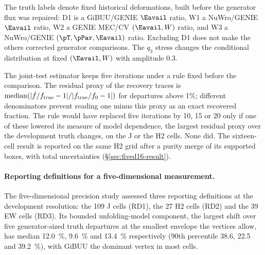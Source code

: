 The truth labels denote fixed historical deformations, built before the generator flux was repaired: D1 is a GiBUU/GENIE $\Eavail$ ratio, W1 a NuWro/GENIE $\Eavail$ ratio, W2 a GENIE MEC/CV $(\Eavail,W)$ ratio, and W3 a NuWro/GENIE $(\pT,\pPar,\Eavail)$ ratio. Excluding D1 does not make the others corrected generator comparisons. The $q_3$ stress changes the conditional distribution at fixed $(\Eavail,W)$ with amplitude 0.3.

The joint-test estimator keeps five iterations under a rule fixed before the comparison. The residual proxy of the recovery traces is $\operatorname{median}(|\hat f/f_{\rm true}-1|/|f_{\rm true}/f_0-1|)$ for departures above 1\%; different denominators prevent reading one minus this proxy as an exact recovered fraction. The rule would have replaced five iterations by 10, 15 or 20 only if one of these lowered its measure of model dependence, the largest residual proxy over the development truth changes, on the J or the H2 cells. None did. The sixteen-cell result is reported on the same H2 grid after a purity merge of its supported boxes, with total uncertainties (\S\ref{sec:fived16-result}).

\paragraph{Reporting definitions for a five-dimensional measurement.} The five-dimensional precision study assessed three reporting definitions at the development resolution: the 109 J cells (RD1), the 27 H2 cells (RD2) and the 39 EW cells (RD3). Its bounded unfolding-model component, the largest shift over five generator-sized truth departures at the smallest envelope the vertices allow, has median \SI{12.0}{\percent}, \SI{9.6}{\percent} and \SI{13.4}{\percent} respectively (90th percentile 38.6, 22.5 and \SI{39.2}{\percent}), with GiBUU the dominant vertex in most cells.

